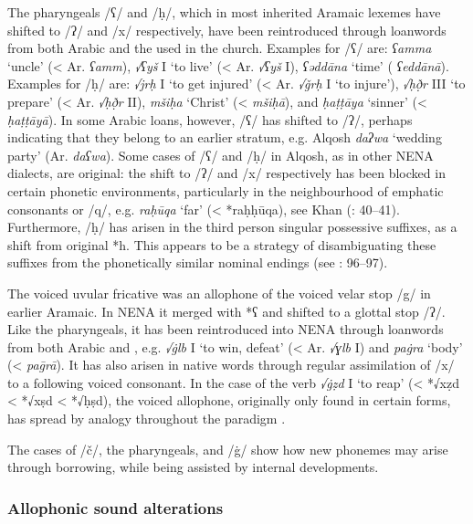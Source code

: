 \documentclass[output=paper]{langsci/langscibook}
\begin{document}
The {pharyngeals} /ʕ/ and /ḥ/, which in most inherited Aramaic lexemes have shifted to /ʔ/ and /x/ respectively, have been reintroduced through {loanwords} from both Arabic and the   used in the church. Examples for /ʕ/ are: \textit{ʕamma} ‘uncle’ (< Ar. \textit{ʕamm}), \textit{√ʕyš} I ‘to live’ (< Ar. \textit{√ʕyš} I), \textit{ʕəddāna} ‘time’ ( \textit{ʕeddānā}). Examples for /ḥ/ are: \textit{√jrḥ} I ‘to get injured’ (< Ar. \textit{√ǧrḥ} I ‘to injure’), \textit{√ḥð̣r} III ‘to prepare’ (<  Ar. \textit{√ḥð̣r} II), \textit{mšiḥa} ‘Christ’ (<  \textit{mšiḥā}), and \textit{ḥaṭṭāya} ‘sinner’ (<  \textit{ḥaṭṭāyā}). In some Arabic loans, however, /ʕ/ has shifted to /ʔ/, perhaps indicating that they belong to an earlier stratum, e.g.  Alqosh \textit{daʔwa} ‘wedding party’ (Ar. \textit{daʕwa}). Some cases of /ʕ/ and /ḥ/ in Alqosh, as in other NENA dialects, are original: the shift to /ʔ/ and /x/ respectively has been blocked in certain phonetic environments, particularly in the neighbourhood of {emphatic consonants} or /q/, e.g. \textit{raḥūqa} ‘far’ (< *raḥḥūqa), see Khan (\citeyear{Khan2002}: 40–41). Furthermore, /ḥ/ has arisen in the third person singular possessive suffixes, as a shift from original *h. This appears to be a strategy of disambiguating these suffixes from the phonetically similar nominal endings (see \citealt{Coghill2008}: 96–97).

The voiced uvular fricative was an allophone of the voiced velar stop /g/ in earlier Aramaic. In NENA it {merged} with *ʕ and shifted to a glottal stop /ʔ/. Like the {pharyngeals}, it has been reintroduced into NENA through {loanwords} from both Arabic and  , e.g. \textit{√\.glb} I ‘to win, defeat’ (< Ar. \textit{√ɣlb} I) and \textit{pa\.gra} ‘body’ (<  \textit{pa\={g}rā}). It has also arisen in native words through regular assimilation of /x/ to a following voiced consonant. In the case of the verb \textit{√\.gẓd} I ‘to reap’ (< *√xẓd < *√xṣd  < *√ḥṣd), the voiced allophone, originally only found in certain forms, has spread by {analogy} throughout the paradigm \citep[20]{Coghill2004}.

The cases of /č/, the {pharyngeals}, and /\.g/ show how new phonemes may arise through borrowing, while being assisted by internal developments.

\subsubsection{Allophonic sound alterations}
\end{document}
